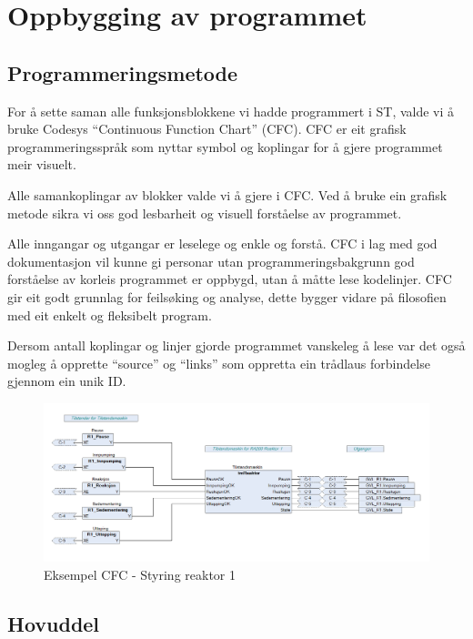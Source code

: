 \newpage
\section{Oppbygging av programmet}
\thispagestyle{fancy}

\subsection{Programmeringsmetode}
For å sette saman alle funksjonsblokkene vi hadde programmert i \gls{ST}, valde vi å bruke \gls{Codesys} ``Continuous Function Chart'' (\gls{CFC}).
\gls{CFC} er eit grafisk programmeringsspråk som nyttar symbol og koplingar for å gjere programmet meir visuelt.

Alle samankoplingar av blokker valde vi å gjere i \gls{CFC}. Ved å bruke ein grafisk metode sikra vi oss god lesbarheit og
visuell forståelse av programmet. 

Alle inngangar og utgangar er leselege og enkle og forstå. \gls{CFC} i lag med god dokumentasjon vil kunne gi personar utan programmeringsbakgrunn
god forståelse av korleis programmet er oppbygd, utan å måtte lese kodelinjer.
\gls{CFC} gir eit godt grunnlag for feilsøking og analyse, dette bygger vidare på filosofien med eit enkelt og fleksibelt program.

Dersom antall koplingar og linjer gjorde programmet vanskeleg å lese var det også
mogleg å opprette ``source'' og ``links'' som oppretta ein trådlaus forbindelse gjennom ein unik ID.

\begin{figure}[htbp]
    \centering
    \includegraphics[width=1\textwidth]{Bilder/ReaktorPRG.png}
    \caption{Eksempel \gls{CFC} - Styring reaktor 1}\label{fig:CFCReaktor}
\end{figure}

\newpage

\subsection{Hovuddel}

